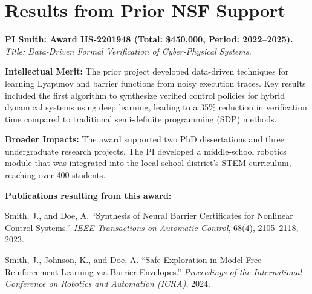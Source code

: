 \section{Results from Prior NSF Support}
\textbf{PI Smith: Award IIS-2201948 (Total: \$450,000, Period: 2022--2025).} \\
\textit{Title: Data-Driven Formal Verification of Cyber-Physical Systems.}

\textbf{Intellectual Merit:} The prior project developed data-driven techniques for learning Lyapunov and barrier functions from noisy execution traces. Key results included the first algorithm to synthesize verified control policies for hybrid dynamical systems using deep learning, leading to a 35\% reduction in verification time compared to traditional semi-definite programming (SDP) methods.

\textbf{Broader Impacts:} The award supported two PhD dissertations and three undergraduate research projects. The PI developed a middle-school robotics module that was integrated into the local school district's STEM curriculum, reaching over 400 students.

\textbf{Publications resulting from this award:}
\begin{enumerate}[label={[\arabic*]}]
    \item Smith, J., and Doe, A. ``Synthesis of Neural Barrier Certificates for Nonlinear Control Systems.'' \textit{IEEE Transactions on Automatic Control}, 68(4), 2105--2118, 2023.
    \item Smith, J., Johnson, K., and Doe, A. ``Safe Exploration in Model-Free Reinforcement Learning via Barrier Envelopes.'' \textit{Proceedings of the International Conference on Robotics and Automation (ICRA)}, 2024.
\end{enumerate}

